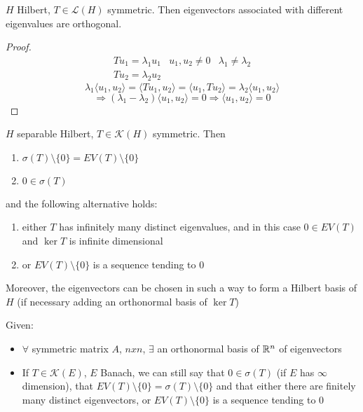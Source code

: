 \begin{proposition}
    \(H\) Hilbert, \(T \in \mathcal{L}(H)\) symmetric. Then eigenvectors associated with different eigenvalues are orthogonal. 
\end{proposition}
\begin{proof}
    \[
        \begin{array}{ccc}
            Tu_1 = \lambda_1 u_1 & u_1, u_2 \neq 0 & \lambda_1 \neq \lambda_2 \\
            Tu_2 = \lambda_2 u_2 
        \end{array}
    \]
    \[
        \lambda_1 \langle u_1, u_2 \rangle = \langle Tu_1, u_2\rangle = \langle u_1, T u_2\rangle = \lambda_2 \langle u_1, u_2\rangle
    \]
    \[
        \Rightarrow (\lambda_1 - \lambda_2) \langle u_1, u_2\rangle = 0 \Rightarrow \langle u_1, u_2\rangle = 0
    \]
\end{proof}

\begin{theorem}
    \(H\) separable Hilbert, \(T \in \mathcal{K}(H)\) symmetric. Then
    \begin{enumerate}
        \item \(\sigma(T) \setminus \{0\} = EV (T) \setminus \{0\}\)
        \item \(0 \in \sigma(T)\)
    \end{enumerate}
    and the following alternative holds:
    \begin{enumerate}
        \item either \(T\) has infinitely many distinct eigenvalues, and in this case \(0 \in EV(T)\) and \(\ker T\) is infinite dimensional
        \item or \(EV(T) \setminus \{0\} \) is a sequence tending to \(0\)
    \end{enumerate}
    Moreover, the eigenvectors can be chosen in such a way to form a Hilbert basis of \(H\) (if necessary adding an orthonormal basis of \(\ker T\))
\end{theorem}

\begin{remark}
    Given:
    \begin{itemize}
        \item \(\forall\) symmetric matrix \(A\), \(n x n \), \(\exists\) an orthonormal basis of \(\mathbb{R}^n\) of eigenvectors
        \item If \(T \in \mathcal{K}(E)\), \(E\) Banach, we can still say that \(0 \in \sigma(T)\) (if \(E\) has \(\infty\) dimension), that \(EV(T) \setminus \{0\} = \sigma(T) \setminus \{0\}\) and that either there are finitely many distinct eigenvectors, or \(EV(T) \setminus \{0\}\) is a sequence tending to \(0\)
    \end{itemize}
\end{remark}

